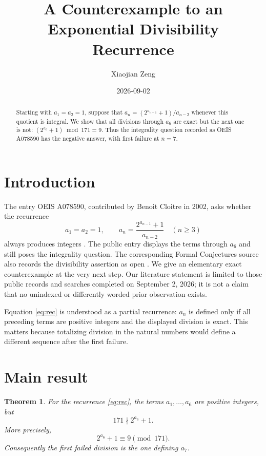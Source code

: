 \documentclass[11pt]{amsart}
\title{A Counterexample to an Exponential Divisibility Recurrence}
\author{Xiaojian Zeng}
\date{2026-09-02}
\newtheorem{theorem}{Theorem}[section]
\theoremstyle{definition}
\begin{document}
\begin{abstract}
Starting with $a_1=a_2=1$, suppose that
$a_n=(2^{a_{n-1}}+1)/a_{n-2}$ whenever this quotient is integral.
We show that all divisions through $a_6$ are exact but the next one is not:
$(2^{a_6}+1)\bmod 171=9$.  Thus the integrality question recorded as
OEIS A078590 has the negative answer, with first failure at $n=7$.
\end{abstract}

\maketitle

\section{Introduction}
The entry OEIS A078590, contributed by Benoit Cloitre in 2002, asks whether
the recurrence
\begin{equation}\label{eq:rec}
 a_1=a_2=1,\qquad a_n=\frac{2^{a_{n-1}}+1}{a_{n-2}}\quad(n\geq3)
\end{equation}
always produces integers \cite{oeis}.  The public entry displays the terms
through $a_6$ and still poses the integrality question.  The corresponding
Formal Conjectures source also records the divisibility assertion as open
\cite{formalconjectures}.  We give an elementary exact counterexample at the
very next step.  Our literature statement is limited to those public records
and searches completed on September 2, 2026; it is not a claim that no
unindexed or differently worded prior observation exists.

Equation \eqref{eq:rec} is understood as a partial recurrence: $a_n$ is
defined only if all preceding terms are positive integers and the displayed
division is exact.  This matters because totalizing division in the natural
numbers would define a different sequence after the first failure.

\section{Main result}

\begin{theorem}\label{thm:main}
For the recurrence \eqref{eq:rec}, the terms $a_1,\ldots,a_6$ are positive
integers, but
\[
 171\nmid 2^{a_6}+1.
\]
More precisely,
\[
 2^{a_6}+1\equiv9\pmod{171}.
\]
Consequently the first failed division is the one defining $a_7$.
\end{theorem}
\end{document}
